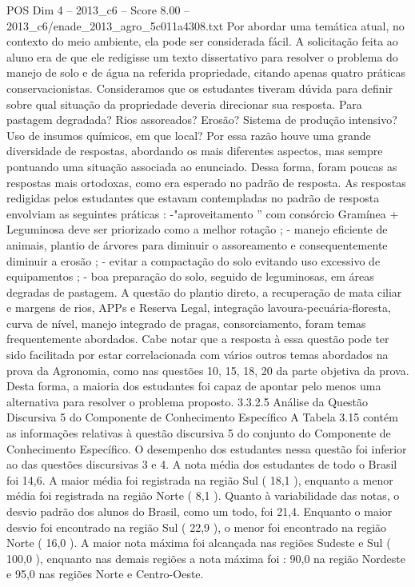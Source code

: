 \begin{textsample}{POS Dim 4 – 2013\_c6 – Score 8.00 – 2013\_c6/enade\_2013\_agro\_5c011a4308.txt}
Por abordar uma temática atual, no contexto do meio ambiente, ela pode ser considerada fácil.
A solicitação feita ao aluno era de que ele redigisse um texto dissertativo para resolver o problema do manejo de solo e de água na referida propriedade, citando apenas quatro práticas conservacionistas.
Consideramos que os estudantes tiveram dúvida para definir sobre qual situação da propriedade deveria direcionar sua resposta.
Para pastagem degradada?
Rios assoreados?
Erosão?
Sistema de produção intensivo?
Uso de insumos químicos, em que local?
Por essa razão houve uma grande diversidade de respostas, abordando os mais diferentes aspectos, mas sempre pontuando uma situação associada ao enunciado.
Dessa forma, foram poucas as respostas mais ortodoxas, como era esperado no padrão de resposta.
As respostas redigidas pelos estudantes que estavam contempladas no padrão de resposta envolviam as seguintes práticas : -"aproveitamento ” com consórcio Gramínea + Leguminosa deve ser priorizado como a melhor rotação ; - manejo eficiente de animais, plantio de árvores para diminuir o assoreamento e consequentemente diminuir a erosão ; - evitar a compactação do solo evitando uso excessivo de equipamentos ; - boa preparação do solo, seguido de leguminosas, em áreas degradas de pastagem.
A questão do plantio direto, a recuperação de mata ciliar e margens de rios, APPs e Reserva Legal, integração lavoura-pecuária-floresta, curva de nível, manejo integrado de pragas, consorciamento, foram temas frequentemente abordados.
Cabe notar que a resposta à essa questão pode ter sido facilitada por estar correlacionada com vários outros temas abordados na prova da Agronomia, como nas questões 10, 15, 18, 20 da parte objetiva da prova.
Desta forma, a maioria dos estudantes foi capaz de apontar pelo menos uma alternativa para resolver o problema proposto. 3.3.2.5 Análise da Questão Discursiva 5 do Componente de Conhecimento Específico A Tabela 3.15 contém as informações relativas à questão discursiva 5 do conjunto do Componente de Conhecimento Específico.
O desempenho dos estudantes nessa questão foi inferior ao das questões discursivas 3 e 4.
A nota média dos estudantes de todo o Brasil foi 14,6.
A maior média foi registrada na região Sul ( 18,1 ), enquanto a menor média foi registrada na região Norte ( 8,1 ).
Quanto à variabilidade das notas, o desvio padrão dos alunos do Brasil, como um todo, foi 21,4.
Enquanto o maior desvio foi encontrado na região Sul ( 22,9 ), o menor foi encontrado na região Norte ( 16,0 ).
A maior nota máxima foi alcançada nas regiões Sudeste e Sul ( 100,0 ), enquanto nas demais regiões a nota máxima foi : 90,0 na região Nordeste e 95,0 nas regiões Norte e Centro-Oeste.

\end{textsample}
